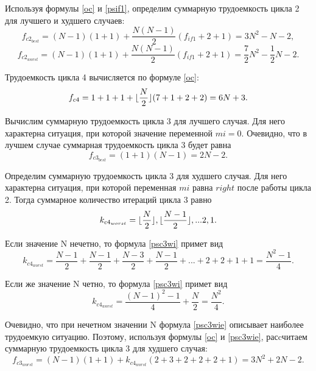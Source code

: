 Используя формулы \eqref{oc} и \eqref{psif1}, определим суммарную трудоемкость цикла 2 для лучшего и худшего случаев:
\begin{equation}\label{psc2b}
	f_{c2_{best}} = (N - 1)(1 + 1) + \frac{N(N - 1)}{2}(f_{if1} + 2 + 1) = 3N^2 - N - 2,
\end{equation}
\begin{equation}\label{psc2w}
	f_{c2_{worst}} = (N - 1)(1 + 1) + \frac{N(N - 1)}{2}(f_{if1} + 2 + 1) = \frac{7}{2}N^2 - \frac{1}{2}N - 2.
\end{equation}

Трудоемкость цикла 4 вычисляется по формуле \eqref{oc}:
\begin{equation}\label{psc4}
	f_{c4} = 1 + 1 + 1 + \lfloor \frac{N}{2} \rfloor(7 + 1 + 2 + 2) = 6N + 3.
\end{equation}

Вычислим суммарную трудоемкость цикла 3 для лучшего случая. Для него характерна ситуация, при которой значение переменной $mi = 0$. Очевидно, что в лучшем случае суммарная трудоемкость цикла 3 будет равна
\begin{equation}\label{psc3b}
	f_{c3_{best}} = (1 + 1)(N - 1) = 2N - 2.
\end{equation}

Определим суммарную трудоемкость цикла 3 для худшего случая. Для него характерна ситуация, при которой переменная $mi$ равна $right$ после работы цикла 2. Тогда суммарное количество итераций цикла 3 равно
\begin{equation}\label{psc3wi}
	k_{c4_{worst}} = \lfloor \frac{N}{2} \rfloor, \lfloor \frac{N - 1}{2} \rfloor, ... 2, 1.
\end{equation}

Если значение N нечетно, то формула \eqref{psc3wi} примет вид
\begin{equation}\label{psc3wio}
	k_{c4_{worst}} = \frac{N - 1}{2} + \frac{N - 1}{2} + \frac{N - 3}{2} + \frac{N - 1}{2} + ... + 2 + 2 + 1 + 1 = \frac{N^2 - 1}{4}.
\end{equation}

Если же значение N четно, то формула \eqref{psc3wi} примет вид
\begin{equation}\label{psc3wie}
	k_{c4_{worst}} = \frac{(N - 1)^2 - 1}{4} + \frac{N}{2} = \frac{N^2}{4}.
\end{equation}

Очевидно, что при нечетном значении N формула \eqref{psc3wie} описывает наиболее трудоемкую ситуацию. Поэтому, используя формулы \eqref{oc} и \eqref{psc3wie}, расcчитаем суммарную трудоемкость цикла 3 для худшего случая:
\begin{equation}\label{psc3w}
	f_{c3_{worst}} = (N - 1)(1 + 1) + k_{c4_{worst}}(2 + 3 + 2 + 2 + 2 + 1) = 3N^2 + 2N - 2.
\end{equation}

